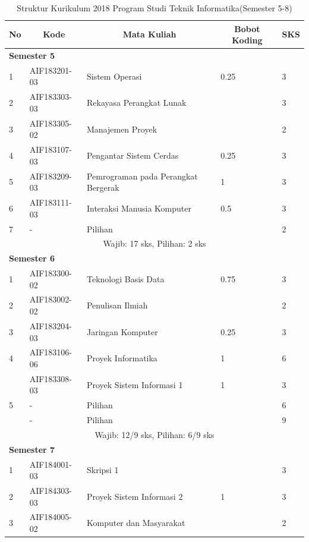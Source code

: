 \begin{table}[H]
	\caption{Struktur Kurikulum 2018 Program Studi Teknik Informatika(Semester 5-8)}
	\centering
		\begin{tabular}{|p{0.5cm}|p{2.85cm}|p{4.95cm}|p{2.7cm}|p{2.7cm}|}
			\hline
			\multicolumn{1}{|c|}{\textbf{No}} & \multicolumn{1}{c|}{\textbf{Kode}} & \multicolumn{1}{c|}{\textbf{Mata Kuliah}} & \multicolumn{1}{c|}{\textbf{Bobot Koding}} & \multicolumn{1}{c|}{\textbf{SKS}} \\ \hline
			\multicolumn{5}{|l|}{\textbf{Semester 5}} \\ \hline
			1 &	AIF183201-03 &	Sistem Operasi &	0.25 &	3  \\ \hline
			2	& AIF183303-03 &	Rekayasa Perangkat Lunak &  &	3  \\ \hline
			3	& AIF183305-02 &	Manajemen Proyek &  &	2  \\ \hline
			4 &	AIF183107-03 & Pengantar Sistem Cerdas & 0.25 &	3  \\ \hline
			5 &	AIF183209-03 &	Pemrograman pada Perangkat Bergerak &	1 &	3 \\ \hline
			6 &	AIF183111-03 &	Interaksi Manusia Komputer &	0.5 &	3  \\ \hline
			7 &	- &	Pilihan &	&	2  \\ \hline
			\multicolumn{5}{|c|}{Wajib: 17 sks, Pilihan: 2 sks} \\ \hline
			\multicolumn{5}{|l|}{\textbf{Semester 6}} \\ \hline
			1	& AIF183300-02 &	Teknologi Basis Data &	0.75 &	3  \\ \hline
			2	& AIF183002-02 &	Penulisan Ilmiah &  &	2  \\ \hline
			3	& AIF183204-03 &	Jaringan Komputer &	0.25 &	3  \\ \hline
			4	& AIF183106-06 &	Proyek Informatika &	1 &	6 \\ \hline
				& AIF183308-03 &	Proyek Sistem Informasi 1	& 1 &	3  \\ \hline
			5	& - &	Pilihan &	&	6  \\ \hline
				& - &	Pilihan	& &	9  \\ \hline
			\multicolumn{5}{|c|}{Wajib: 12/9 sks, Pilihan: 6/9 sks} \\ \hline
			\multicolumn{5}{|l|}{\textbf{Semester 7}} \\ \hline
			1	& AIF184001-03	& Skripsi 1	& &	3  \\ \hline
			2	& AIF184303-03	& Proyek Sistem Informasi 2 &	1 &	3  \\ \hline
			3	& AIF184005-02	& Komputer dan Masyarakat &	&	2  \\ \hline

\end{tabular}
\end{table}
